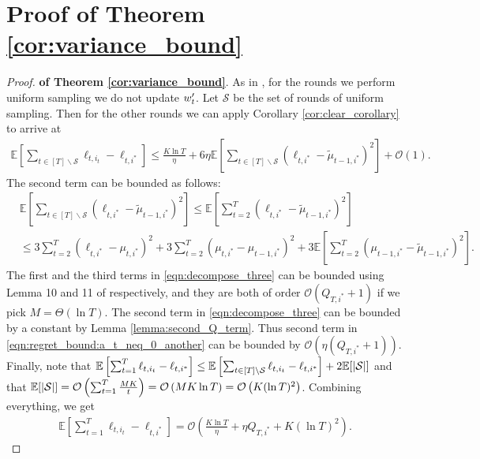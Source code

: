 \section{Proof of Theorem \ref{cor:variance_bound}}
\begin{proof}{\textbf{of Theorem \ref{cor:variance_bound}}.}
As in \cite{hazan2011better}, 
for the rounds we perform uniform sampling we do not update $w_t^\prime$. 
Let $\mathcal{S}$ be the set of rounds of uniform sampling. %
Then for the other rounds we can apply Corollary \ref{cor:clear_corollary} to arrive at
\begin{align}
\mathbb{E}\left[\sum_{t\in [T]\backslash \mathcal{S}} \ell_{t,i_t}-\ell_{t,i^*} \right]\leq \frac{K\ln T}{\eta} + 6\eta \mathbb{E}\left[\sum_{t\in [T]\backslash \mathcal{S}}(\ell_{t,i^*}-\tilde{\mu}_{t-1,i^*})^2\right] + \mathcal{O}(1). \label{eqn:regret_bound:a_t_neq_0_another} 
\end{align}
The second term can be bounded as follows: 
\begin{align}
&\mathbb{E}\left[\sum_{t\in [T]\backslash \mathcal{S}} (\ell_{t,i^*}-\tilde{\mu}_{t-1,i^*})^2\right]\leq \mathbb{E}\left[\sum_{t=2}^T (\ell_{t,i^*}-\tilde{\mu}_{t-1,i^*})^2\right] \nonumber \\
&\leq 3\sum_{t=2}^T(\ell_{t,i^*}-\mu_{t,i^*})^2+3\sum_{t=2}^T(\mu_{t,i^*}-\mu_{t-1,i^*})^2 + 3\mathbb{E}\left[\sum_{t=2}^T(\mu_{t-1,i^*}-\tilde{\mu}_{t-1,i^*})^2\right].\label{eqn:decompose_three}
\end{align}
The first and the third terms in \eqref{eqn:decompose_three} can be bounded using Lemma 10 and 11 of \citep{hazan2011better} respectively, and they are both of order $\mathcal{O}(Q_{T,i^*}+1)$ if we pick $M=\Theta(\ln T)$. The second term in \eqref{eqn:decompose_three} can be bounded by a constant by Lemma \ref{lemma:second_Q_term}. Thus second term in \eqref{eqn:regret_bound:a_t_neq_0_another}  can be bounded by $\mathcal{O}\left(\eta (Q_{T,i^*}+1)\right)$. Finally, note that $\mathbb{E}\left[\sum_{t=1}^T \ell_{t,i_t}-\ell_{t,i^*} \right]\leq\mathbb{E}\left[\sum_{t\in [T]\backslash \mathcal{S}} \ell_{t,i_t}-\ell_{t,i^*} \right]+2\mathbb{E}[\lvert {\mathcal{S}} \rvert]$ and that $\mathbb{E}[\lvert {\mathcal{S}} \rvert]=\mathcal{O}\left(\sum_{t=1}^T \frac{MK}{t}\right)=\mathcal{O}\left(MK\ln T\right)=\mathcal{O}\left(K(\ln T)^2\right)$. Combining everything, we get 
\begin{align*}
\mathbb{E}\left[\sum_{t=1}^T \ell_{t,i_t}-\ell_{t,i^*} \right]=\mathcal{O}\left( \frac{K\ln T}{\eta} + \eta Q_{T,i^*} + K(\ln T)^2\right).
\end{align*}
\end{proof}

